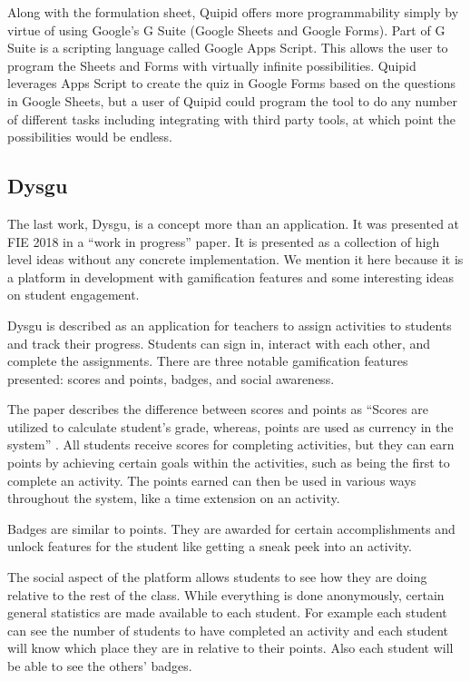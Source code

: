 \documentclass{article}
\begin{document}
Along with the formulation sheet, Quipid offers more programmability simply by virtue of using Google's G Suite (Google Sheets and Google Forms). Part of G Suite is a scripting language called Google Apps Script. This allows the user to program the Sheets and Forms with virtually infinite possibilities. Quipid leverages Apps Script to create the quiz in Google Forms based on the questions in Google Sheets, but a user of Quipid could program the tool to do any number of different tasks including integrating with third party tools, at which point the possibilities would be endless.  

\subsection{Dysgu}
The last work, Dysgu, is a concept more than an application. It was presented at FIE 2018 in a ``work in progress'' paper. It is presented as a collection of high level ideas without any concrete implementation. We mention it here because it is a platform in development with gamification features and some interesting ideas on student engagement.
\smallskip

Dysgu is described as an application for teachers to assign activities to students and track their progress. Students can sign in, interact with each other, and complete the assignments. There are three notable gamification features presented: scores and points, badges, and social awareness.
\smallskip

The paper describes the difference between scores and points as ``Scores are utilized to calculate student’s grade, whereas, points are used as currency in the system'' \cite{dysgu}. All students receive scores for completing activities, but they can earn points by achieving certain goals within the activities, such as being the first to complete an activity. The points earned can then be used in various ways throughout the system, like a time extension on an activity. 
\smallskip

Badges are similar to points. They are awarded for certain accomplishments and unlock features for the student like getting a sneak peek into an activity.   
\smallskip

The social aspect of the platform allows students to see how they are doing relative to the rest of the class. While everything is done anonymously, certain general statistics are made available to each student. For example each student can see the number of students to have completed an activity and each student will know which place they are in relative to their points. Also each student will be able to see the others' badges. 
\end{document}
